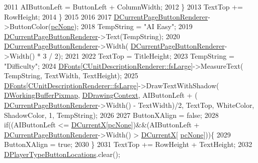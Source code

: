 \begin{DoxyCode}
2011             AIButtonLeft = ButtonLeft + ColumnWidth;
2012         \}
2013         TextTop += RowHeight;
2014     \}
2015     
2016     
2017     \hyperlink{classCApplicationData_abfe1743f2634b069ccc811db4a8733a8}{DCurrentPageButtonRenderer}->ButtonColor(\hyperlink{GameDataTypes_8h_aafb0ca75933357ff28a6d7efbdd7602fa88767aa8e02c7b3192bbab4127b3d729}{pcNone});
2018     TempString = \textcolor{stringliteral}{"AI Easy"};
2019     \hyperlink{classCApplicationData_abfe1743f2634b069ccc811db4a8733a8}{DCurrentPageButtonRenderer}->Text(TempString);   
2020     \hyperlink{classCApplicationData_abfe1743f2634b069ccc811db4a8733a8}{DCurrentPageButtonRenderer}->Width(
      \hyperlink{classCApplicationData_abfe1743f2634b069ccc811db4a8733a8}{DCurrentPageButtonRenderer}->Width() * 3 / 2);
2021     
2022     TextTop = TitleHeight;
2023     TempString = \textcolor{stringliteral}{"Difficulty"};
2024     \hyperlink{classCApplicationData_afde9247d0a3ea87393ec86dcdb1e8274}{DFonts}[\hyperlink{classCUnitDescriptionRenderer_a3ea4cd83b6dd9533ab3abb953a7da35aaf467097fe4f4811a5e2f1959c86e071d}{CUnitDescriptionRenderer::fsLarge}]->MeasureText(
      TempString, TextWidth, TextHeight);
2025     \hyperlink{classCApplicationData_afde9247d0a3ea87393ec86dcdb1e8274}{DFonts}[\hyperlink{classCUnitDescriptionRenderer_a3ea4cd83b6dd9533ab3abb953a7da35aaf467097fe4f4811a5e2f1959c86e071d}{CUnitDescriptionRenderer::fsLarge}]->DrawTextWithShadow(
      \hyperlink{classCApplicationData_afa34cf2780f38dd28c0c811e69d60a97}{DWorkingBufferPixmap}, \hyperlink{classCApplicationData_aa6c5bea9bdcc64398e5a3f693661d37c}{DDrawingContext}, AIButtonLeft + (
      \hyperlink{classCApplicationData_abfe1743f2634b069ccc811db4a8733a8}{DCurrentPageButtonRenderer}->Width() - TextWidth)/2, TextTop, WhiteColor, 
      ShadowColor, 1, TempString);
2026     
2027     ButtonXAlign = \textcolor{keyword}{false};
2028     \textcolor{keywordflow}{if}((AIButtonLeft <= \hyperlink{classCApplicationData_a1dc7ee482a39f7978c71365ac540f97a}{DCurrentX}[\hyperlink{GameDataTypes_8h_aafb0ca75933357ff28a6d7efbdd7602fa88767aa8e02c7b3192bbab4127b3d729}{pcNone}])&&(AIButtonLeft + 
      \hyperlink{classCApplicationData_abfe1743f2634b069ccc811db4a8733a8}{DCurrentPageButtonRenderer}->Width() > \hyperlink{classCApplicationData_a1dc7ee482a39f7978c71365ac540f97a}{DCurrentX}[
      \hyperlink{GameDataTypes_8h_aafb0ca75933357ff28a6d7efbdd7602fa88767aa8e02c7b3192bbab4127b3d729}{pcNone}]))\{
2029         ButtonXAlign = \textcolor{keyword}{true};
2030     \}
2031     TextTop += RowHeight + TextHeight;
2032     \hyperlink{classCApplicationData_a49d2ad6ab469e18577716ac993b475cb}{DPlayerTypeButtonLocations}.clear();

\end{DoxyCode}

